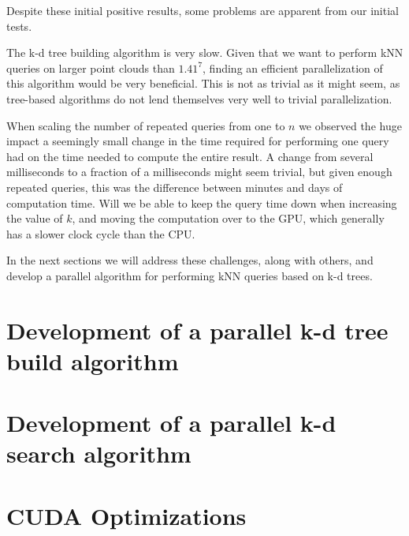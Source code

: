 Despite these initial positive results, some problems are apparent from our initial tests.

The k-d tree building algorithm is very slow. Given that we want to perform kNN queries on larger point clouds than $1.41^7$, finding an efficient parallelization of this algorithm would be very beneficial. This is not as trivial as it might seem, as tree-based algorithms do not lend themselves very well to trivial parallelization.

When scaling the number of repeated queries from one to $n$ we observed the huge impact a seemingly small change in the time required for performing one query had on the time needed to compute the entire result. A change from several milliseconds to a fraction of a milliseconds might seem trivial, but given enough repeated queries, this was the difference between minutes and days of computation time. Will we be able to keep the query time down when increasing the value of $k$, and moving the computation over to the GPU, which generally has a slower clock cycle than the CPU.

In the next sections we will address these challenges, along with others, and develop a parallel algorithm for performing kNN queries based on k-d trees.

\section{Development of a parallel k-d tree build algorithm} %
\label{sec:development_of_a_parallel_k_d_tree_build_algorithm}



\section{Development of a parallel k-d search algorithm} %
\label{sec:development_of_a_parallel_k_d_search_algorithm}




\section{CUDA Optimizations} %
\label{sec:cuda_optimizations}

